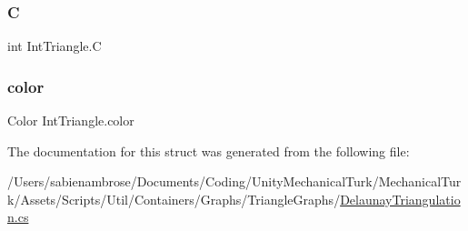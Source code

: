 \subsubsection{\texorpdfstring{C}{C}}
{\footnotesize\ttfamily int Int\+Triangle.\+C}

\mbox{\label{struct_int_triangle_ae9cde6792664a068319a30c3874e57f9}} 
\subsubsection{\texorpdfstring{color}{color}}
{\footnotesize\ttfamily Color Int\+Triangle.\+color}



The documentation for this struct was generated from the following file\+:\begin{DoxyCompactItemize}
\item 
/\+Users/sabienambrose/\+Documents/\+Coding/\+Unity\+Mechanical\+Turk/\+Mechanical\+Turk/\+Assets/\+Scripts/\+Util/\+Containers/\+Graphs/\+Triangle\+Graphs/\mbox{\hyperlink{_delaunay_triangulation_8cs}{Delaunay\+Triangulation.\+cs}}\end{DoxyCompactItemize}
